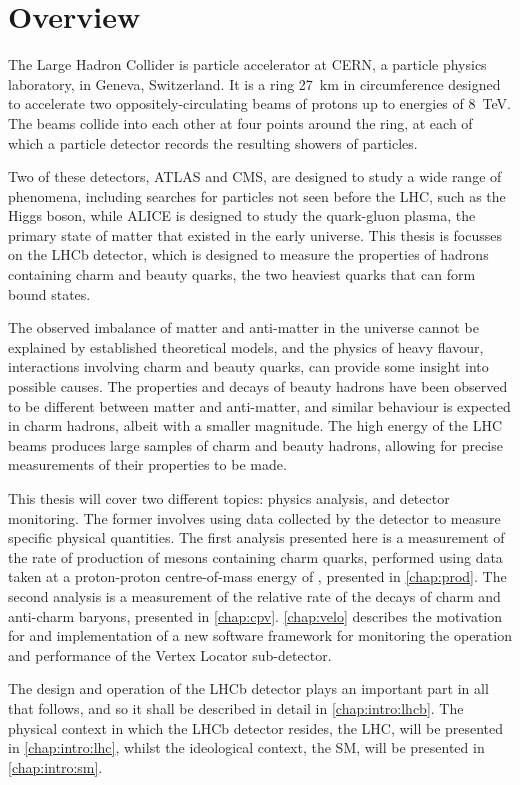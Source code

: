 \chapter{Overview}
\label{chap:intro:overview}

The Large Hadron Collider is particle accelerator at CERN, a particle physics 
laboratory, in Geneva, Switzerland.
It is a ring \SI{27}{\kilo\metre} in circumference designed to accelerate two 
oppositely-circulating beams of protons up to energies of \SI{8}{\TeV}.
The beams collide into each other at four points around the ring, at each of 
which a particle detector records the resulting showers of particles.


Two of these detectors, ATLAS and CMS, are designed to study a wide range of 
phenomena, including searches for particles not seen before the \ac{LHC}, such 
as the Higgs boson, while ALICE is designed to study the quark-gluon plasma, 
the primary state of matter that existed in the early universe.
This thesis is focusses on the LHCb detector, which is designed to measure the 
properties of hadrons containing charm and beauty quarks, the two heaviest 
quarks that can form bound states.

The observed imbalance of matter and anti-matter in the universe cannot be 
explained by established theoretical models, and the physics of heavy flavour, 
interactions involving charm and beauty quarks, can provide some insight into 
possible causes.
The properties and decays of beauty hadrons have been observed to be different 
between matter and anti-matter, and similar behaviour is expected in charm 
hadrons, albeit with a smaller magnitude.
The high energy of the \ac{LHC} beams produces large samples of charm and 
beauty hadrons, allowing for precise measurements of their properties to be 
made.

This thesis will cover two different topics: physics analysis, and detector 
monitoring.
The former involves using data collected by the detector to measure specific 
physical quantities.
The first analysis presented here is a measurement of the rate of production of 
mesons containing charm quarks, performed using data taken at a proton-proton 
centre-of-mass energy of \runtwocom, presented in \cref{chap:prod}.
The second analysis is a measurement of the relative rate of the decays of 
charm and anti-charm baryons, presented in \cref{chap:cpv}.
\cref{chap:velo} describes the motivation for and implementation of a new 
software framework for monitoring the operation and performance of the Vertex 
Locator sub-detector.

The design and operation of the LHCb detector plays an important part in all 
that follows, and so it shall be described in detail in \cref{chap:intro:lhcb}.
The physical context in which the LHCb detector resides, the \ac{LHC}, will be 
presented in \cref{chap:intro:lhc}, whilst the ideological context, the 
\ac{SM}, will be presented in \cref{chap:intro:sm}.

